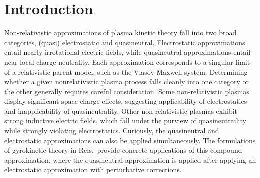 \documentclass[%
 aip,
 amsmath,amssymb,
reprint, onecolumn %
]{revtex4-1}
\begin{document}
\maketitle

\section{Introduction} 

Non-relativistic approximations of plasma kinetic theory fall into two broad categories, (quasi) electrostatic and quasineutral. Electrostatic approximations entail nearly irrotational electric fields, while quasineutral approximations entail near local charge neutrality. Each approximation corresponds to a singular limit of a relativistic parent model, such as the Vlasov-Maxwell system. Determining whether a given nonrelativistic plasma process falls cleanly into one category or the other generally requires careful consideration. Some non-relativistic plasmas display significant space-charge effects, suggesting applicability of electrostatics and inapplicability of quasineutrality. Other non-relativistic plasmas exhibit strong inductive electric fields, which fall under the purview of quasineutraility while strongly violating electrostatics. Curiously, the quasineutral and electrostatic approximations can also be applied simultaneously\cite{y_brenier_formulation_1989,e_grenier_oscillations_1996,m_griffin-pickering_recent_2020}. The formulations of gyrokinetic theory in Refs.\, provide concrete applications of this compound approximation, where the quasineutral approximation is applied after applying an electrostatic approximation with perturbative corrections\cite{sugama_conservation_2013}. 
\end{document}

